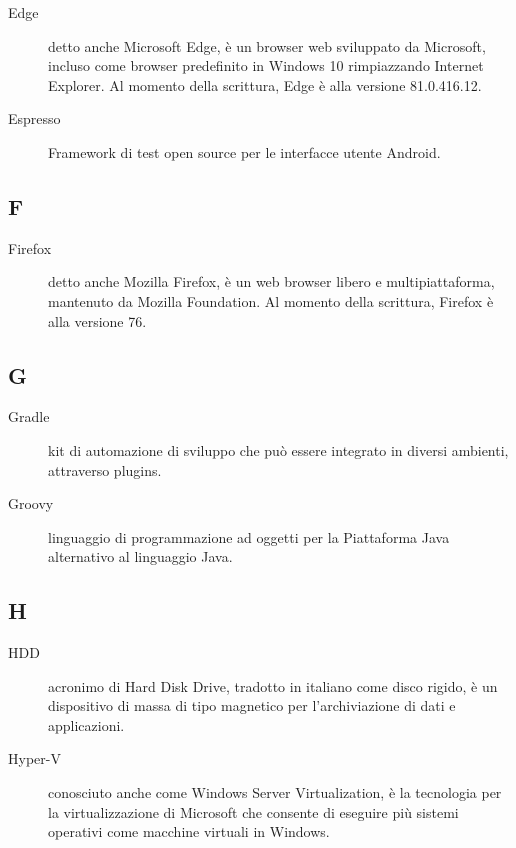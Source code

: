\documentclass[../manuale-manutentore.tex]{subfiles}
\begin{document}
\begin{description}
  \item[Edge] detto anche Microsoft Edge, è un browser web sviluppato da Microsoft, incluso come browser predefinito in Windows 10 rimpiazzando Internet Explorer. Al momento della scrittura, Edge è alla versione 81.0.416.12.
  \item[Espresso] Framework di test open source per le interfacce utente Android.
\end{description}

\subsection{F}

\begin{description}
  \item[Firefox] detto anche Mozilla Firefox, è un web browser libero e multipiattaforma, mantenuto da Mozilla Foundation. Al momento della scrittura, Firefox è alla versione 76.
\end{description}

\subsection{G}

\begin{description}
    \item[Gradle] kit di automazione di sviluppo che può essere integrato in diversi ambienti, attraverso plugins.
    \item[Groovy] linguaggio di programmazione ad oggetti per la Piattaforma Java alternativo al linguaggio Java.
\end{description}

\subsection{H}

\begin{description}
  \item[HDD] acronimo di Hard Disk Drive, tradotto in italiano come disco rigido, è un dispositivo di massa di tipo magnetico per l'archiviazione di dati e applicazioni.
  \item[Hyper-V] conosciuto anche come Windows Server Virtualization, è la tecnologia per la virtualizzazione di Microsoft che consente di eseguire più sistemi operativi come macchine virtuali in Windows.
\end{description}
\end{document}
